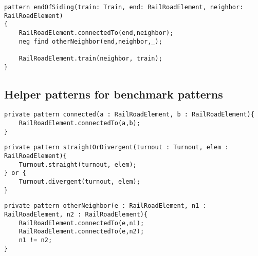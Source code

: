 \begin{lstlisting}[language = vql]
pattern endOfSiding(train: Train, end: RailRoadElement, neighbor: RailRoadElement)
{
	RailRoadElement.connectedTo(end,neighbor);
	neg find otherNeighbor(end,neighbor,_);
	
	RailRoadElement.train(neighbor, train);	
}
\end{lstlisting}

\clearpage

\subsection{Helper patterns for benchmark patterns}


\begin{lstlisting}[language = vql]
private pattern connected(a : RailRoadElement, b : RailRoadElement){
	RailRoadElement.connectedTo(a,b);
}
\end{lstlisting}

\begin{lstlisting}[language = vql]
private pattern straightOrDivergent(turnout : Turnout, elem : RailRoadElement){
	Turnout.straight(turnout, elem);
} or {
	Turnout.divergent(turnout, elem);
}
\end{lstlisting}

\begin{lstlisting}[language = vql]
private pattern otherNeighbor(e : RailRoadElement, n1 : RailRoadElement, n2 : RailRoadElement){	
	RailRoadElement.connectedTo(e,n1);
	RailRoadElement.connectedTo(e,n2);
	n1 != n2;
}

\end{lstlisting}

\vfill


